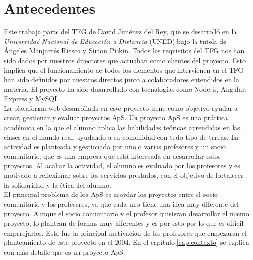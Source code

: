 \documentclass[11pt]{book}
\begin{document}
	\section{Antecedentes}
	Este trabajo parte del TFG de David Jiménez del Rey, que se desarrolló en la \emph{Universidad Nacional de Educación a Distancia} (UNED) bajo la tutela de Ángeles Manjarrés Riesco y Simon Pickin. Todos los requisitos del TFG nos han sido dados por nuestros directores que actuaban como clientes del proyecto. Esto implica que el funcionamiento de todos los elementos que intervienen en el TFG han sido definidos por nuestros directos junto a colaboradores entendidos en la materia. El proyecto ha sido desarrollado con tecnologías como Node.js, Angular, Express y MySQL.\\
	La plataforma web desarrollada en este proyecto tiene como objetivo ayudar a crear, gestionar y evaluar proyectos ApS. Un proyecto ApS es una práctica académica en la que el alumno aplica las habilidades teóricas aprendidas en las clases en el mundo real, ayudando a su comunidad con todo tipo de tareas. La actividad es planteada y gestionada por uno o varios profesores y un socio comunitario, que es una empresa que está interesada en desarrollar estos proyectos. Al acabar la actividad, el alumno es evaluado por los profesores y es motivado a reflexionar sobre los servicios prestados, con el objetivo de fortalecer la solidaridad y la ética del alumno. \\
	El principal problema de los ApS es acordar los proyectos entre el socio comunitario y los profesores, ya que cada uno tiene una idea muy diferente del proyecto. Aunque el socio comunitario y el profesor quisieran desarrollar el mismo proyecto, lo plantean de formas muy diferentes y es por esto por lo que es difícil emparejarlos. Esta fue la principal motivación de los profesores que empezaron el planteamiento de este proyecto en el 2004. En el capítulo \ref{cap:contexto} se explica con más detalle que es un proyecto ApS.\\
\end{document}
